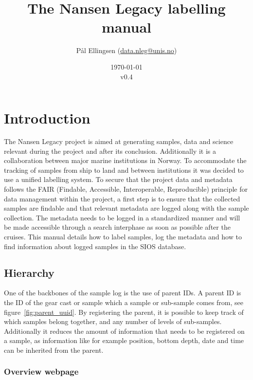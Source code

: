 \documentclass[a4paper,english, 11pt]{article}
\title{The Nansen Legacy labelling manual}
\date{\today\\v0.4}
\author{Pål Ellingsen (\url{data.nleg@unis.no})}
\begin{document}
\maketitle
\tableofcontents
\pagestyle{fancy}
\newpage
\section{Introduction} %
\label{sec:Introduction}

The Nansen Legacy project is aimed at generating samples, data and science relevant during the project and after its conclusion. Additionally it is a collaboration between major marine institutions in Norway. To accommodate the tracking of samples from ship to land and between institutions it was decided to use a unified labelling system. To secure that the project data and metadata follows the FAIR (Findable, Accessible, Interoperable, Reproducible) principle for data management within the project, a first step is to ensure that the collected samples are findable and that relevant metadata are logged
along with the sample collection. The metadata needs to be logged in a standardized manner and will be
made accessible through a search interphase as soon as possible after the cruises.  This manual details how to label samples, log the metadata and how to find information about logged samples in the SIOS database.  



\subsection{Hierarchy} %
\label{sub:Hirarcy}

One of the backbones of the sample log is the use of parent IDs. A parent ID is the ID of the gear cast or sample which a sample or sub-sample comes from, see figure~\ref{fig:parent_uuid}. By registering the parent, it is possible to keep track of which samples belong together, and any number of levels of sub-samples. Additionally it reduces the amount of information that needs to be registered on a sample, as information like for example position, bottom depth, date and time can be inherited from the parent. 

\subsubsection{Overview webpage} %
\label{ssub:Overview_webpage}
\end{document}
